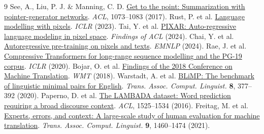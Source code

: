 \documentclass[10pt,a4paper]{article}
\begin{document}
{\fontsize{8.2}{9.2}\selectfont\begin{thebibliography}{9}\setlength{\itemsep}{0pt}
 See, A., Liu, P. J. \& Manning, C. D. \href{https://aclanthology.org/P17-1099/}{Get to the point: Summarization with pointer-generator networks}. \textit{ACL}, 1073--1083 (2017).
 Rust, P. et al. \href{https://arxiv.org/abs/2207.06991}{Language modelling with pixels}. \textit{ICLR} (2023).
 Tai, Y. et al. \href{https://aclanthology.org/2024.findings-acl.874/}{PIXAR: Auto-regressive language modeling in pixel space}. \textit{Findings of ACL} (2024).
 Chai, Y. et al. \href{https://aclanthology.org/2024.emnlp-main.182/}{Autoregressive pre-training on pixels and texts}. \textit{EMNLP} (2024).
 Rae, J. et al. \href{https://github.com/google-deepmind/pg19}{Compressive Transformers for long-range sequence modelling and the PG-19 corpus}. \textit{ICLR} (2020).
 Bojar, O. et al. \href{https://www.statmt.org/wmt18/translation-task.html}{Findings of the 2018 Conference on Machine Translation}. \textit{WMT} (2018).
 Warstadt, A. et al. \href{https://doi.org/10.1162/tacl_a_00321}{BLiMP: The benchmark of linguistic minimal pairs for English}. \textit{Trans. Assoc. Comput. Linguist.} \textbf{8}, 377--392 (2020).
 Paperno, D. et al. \href{https://aclanthology.org/P16-1144/}{The LAMBADA dataset: Word prediction requiring a broad discourse context}. \textit{ACL}, 1525--1534 (2016).
 Freitag, M. et al. \href{https://aclanthology.org/2021.tacl-1.87/}{Experts, errors, and context: A large-scale study of human evaluation for machine translation}. \textit{Trans. Assoc. Comput. Linguist.} \textbf{9}, 1460--1474 (2021).
\end{thebibliography}}
\end{document}

